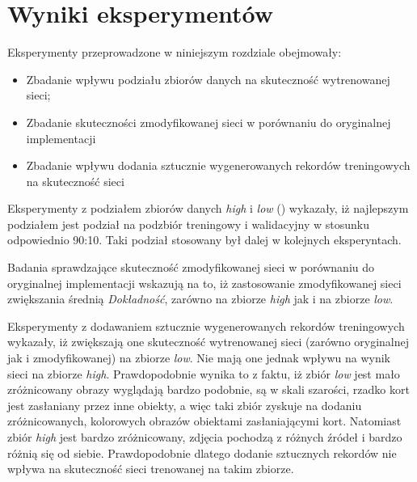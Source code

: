 \section{Wyniki eksperymentów}
Eksperymenty przeprowadzone w niniejszym rozdziale obejmowały:
\begin{itemize}
 \item Zbadanie wpływu podziału zbiorów danych na skuteczność wytrenowanej sieci;
 \item Zbadanie skuteczności zmodyfikowanej sieci w porównaniu do oryginalnej implementacji
 \item Zbadanie wpływu dodania sztucznie wygenerowanych rekordów treningowych na skuteczność sieci
\end{itemize}

Eksperymenty z podziałem zbiorów danych \textit{high} i \textit{low} () wykazały, iż najlepszym podziałem jest podział na podzbiór treningowy i walidacyjny w stosunku odpowiednio 90:10. Taki podział stosowany był dalej w kolejnych eksperyntach.


Badania sprawdzające skuteczność zmodyfikowanej sieci w porównaniu do oryginalnej implementacji wskazują na to, iż zastosowanie zmodyfikowanej sieci zwiększania średnią \textit{Dokładność}, zarówno na zbiorze \textit{high} jak i na zbiorze \textit{low}.


Eksperymenty z dodawaniem sztucznie wygenerowanych rekordów treningowych wykazały, iż zwiększają one skuteczność wytrenowanej sieci (zarówno oryginalnej jak i zmodyfikowanej) na zbiorze \textit{low}. Nie mają one jednak wpływu na wynik sieci na zbiorze \textit{high}. Prawdopodobnie wynika to z faktu, iż zbiór \textit{low} jest mało zróżnicowany obrazy wyglądają bardzo podobnie, są w skali szarości, rzadko kort jest zasłaniany przez inne obiekty, a więc taki zbiór zyskuje na dodaniu zróżnicowanych, kolorowych obrazów obiektami zasłaniającymi kort. Natomiast zbiór \textit{high} jest bardzo zróżnicowany, zdjęcia pochodzą z różnych źródeł i bardzo różnią się od siebie. Prawdopodobnie dlatego dodanie sztucznych rekordów nie wpływa na skuteczność sieci trenowanej na takim zbiorze.
